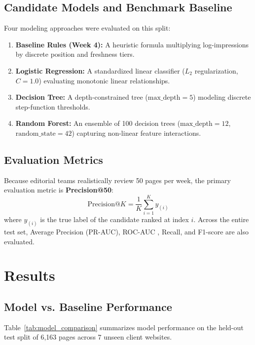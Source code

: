 \documentclass[conference]{IEEEtran}
\begin{document}
\subsection{Candidate Models and Benchmark Baseline}
Four modeling approaches were evaluated on this split:
\begin{enumerate}
    \item \textbf{Baseline Rules (Week 4):} A heuristic formula multiplying log-impressions by discrete position and freshness tiers.
    \item \textbf{Logistic Regression:} A standardized linear classifier ($L_2$ regularization, $C=1.0$) evaluating monotonic linear relationships.
    \item \textbf{Decision Tree:} A depth-constrained tree ($\text{max\_depth}=5$) modeling discrete step-function thresholds.
    \item \textbf{Random Forest:} An ensemble of 100 decision trees ($\text{max\_depth}=12$, $\text{random\_state}=42$) capturing non-linear feature interactions.
\end{enumerate}

\subsection{Evaluation Metrics}
Because editorial teams realistically review 50 pages per week, the primary evaluation metric is \textbf{Precision@50}:
\begin{equation}
\text{Precision@}K = \frac{1}{K} \sum_{i=1}^{K} y_{(i)}
\end{equation}
where $y_{(i)}$ is the true label of the candidate ranked at index $i$. Across the entire test set, Average Precision (PR-AUC), ROC-AUC \cite{fawcett2006introduction}, Recall, and F1-score are also evaluated.

\section{Results}
\subsection{Model vs. Baseline Performance}
Table~\ref{tab:model_comparison} summarizes model performance on the held-out test split of 6,163 pages across 7 unseen client websites.
\end{document}
